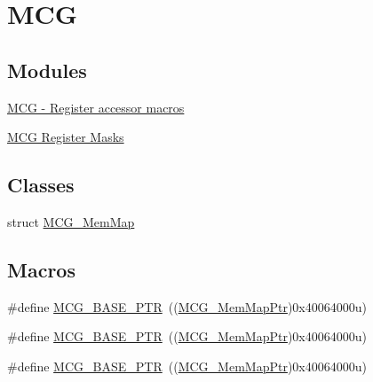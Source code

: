 \hypertarget{group___m_c_g___peripheral}{}\section{M\+CG}
\label{group___m_c_g___peripheral}
\subsection*{Modules}
\begin{DoxyCompactItemize}
\item 
\hyperlink{group___m_c_g___register___accessor___macros}{M\+C\+G -\/ Register accessor macros}
\item 
\hyperlink{group___m_c_g___register___masks}{M\+C\+G Register Masks}
\end{DoxyCompactItemize}
\subsection*{Classes}
\begin{DoxyCompactItemize}
\item 
struct \hyperlink{struct_m_c_g___mem_map}{M\+C\+G\+\_\+\+Mem\+Map}
\end{DoxyCompactItemize}
\subsection*{Macros}
\begin{DoxyCompactItemize}
\item 
\#define \hyperlink{group___m_c_g___peripheral_gaceefc72e93a47a35f59a31c57dddf41b}{M\+C\+G\+\_\+\+B\+A\+S\+E\+\_\+\+P\+TR}~((\hyperlink{group___m_c_g___peripheral_ga1cb93dd00863c129e7753ec45a7c3563}{M\+C\+G\+\_\+\+Mem\+Map\+Ptr})0x40064000u)
\item 
\#define \hyperlink{group___m_c_g___peripheral_gaceefc72e93a47a35f59a31c57dddf41b}{M\+C\+G\+\_\+\+B\+A\+S\+E\+\_\+\+P\+TR}~((\hyperlink{group___m_c_g___peripheral_ga1cb93dd00863c129e7753ec45a7c3563}{M\+C\+G\+\_\+\+Mem\+Map\+Ptr})0x40064000u)
\item 
\#define \hyperlink{group___m_c_g___peripheral_gaceefc72e93a47a35f59a31c57dddf41b}{M\+C\+G\+\_\+\+B\+A\+S\+E\+\_\+\+P\+TR}~((\hyperlink{group___m_c_g___peripheral_ga1cb93dd00863c129e7753ec45a7c3563}{M\+C\+G\+\_\+\+Mem\+Map\+Ptr})0x40064000u)
\end{DoxyCompactItemize}
